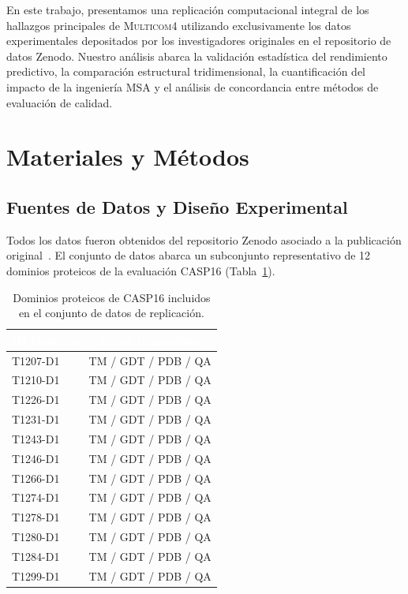 \documentclass[10pt,twocolumn,a4paper]{article}
\newcommand{\multicom}{\textsc{Multicom4}}
\begin{document}
En este trabajo, presentamos una replicación computacional integral de los hallazgos principales de \multicom{} utilizando exclusivamente los datos experimentales depositados por los investigadores originales en el repositorio de datos Zenodo. Nuestro análisis abarca la validación estadística del rendimiento predictivo, la comparación estructural tridimensional, la cuantificación del impacto de la ingeniería MSA y el análisis de concordancia entre métodos de evaluación de calidad.


\section{Materiales y Métodos}

\subsection{Fuentes de Datos y Diseño Experimental}

Todos los datos fueron obtenidos del repositorio Zenodo asociado a la publicación original~\cite{liu2025multicom4}. El conjunto de datos abarca un subconjunto representativo de 12 dominios proteicos de la evaluación CASP16 (Tabla~\ref{tab:domains}).

\begin{table}[H]
\centering
\caption{Dominios proteicos de CASP16 incluidos en el conjunto de datos de replicación.}
\label{tab:domains}
\small
{}
\begin{tabular}{>{\ttfamily\small}l >{\small}c}
\toprule
\rowcolor{tabheader}
\textcolor{white}{\textsf{\textbf{ID Dominio}}} & \textcolor{white}{\textsf{\textbf{Datos Disponibles}}} \\
\midrule
T1207-D1 & TM / GDT / PDB / QA \\
T1210-D1 & TM / GDT / PDB / QA \\
T1226-D1 & TM / GDT / PDB / QA \\
T1231-D1 & TM / GDT / PDB / QA \\
T1243-D1 & TM / GDT / PDB / QA \\
T1246-D1 & TM / GDT / PDB / QA \\
T1266-D1 & TM / GDT / PDB / QA \\
T1274-D1 & TM / GDT / PDB / QA \\
T1278-D1 & TM / GDT / PDB / QA \\
T1280-D1 & TM / GDT / PDB / QA \\
T1284-D1 & TM / GDT / PDB / QA \\
T1299-D1 & TM / GDT / PDB / QA \\
\bottomrule
\end{tabular}
\end{table}
\end{document}
